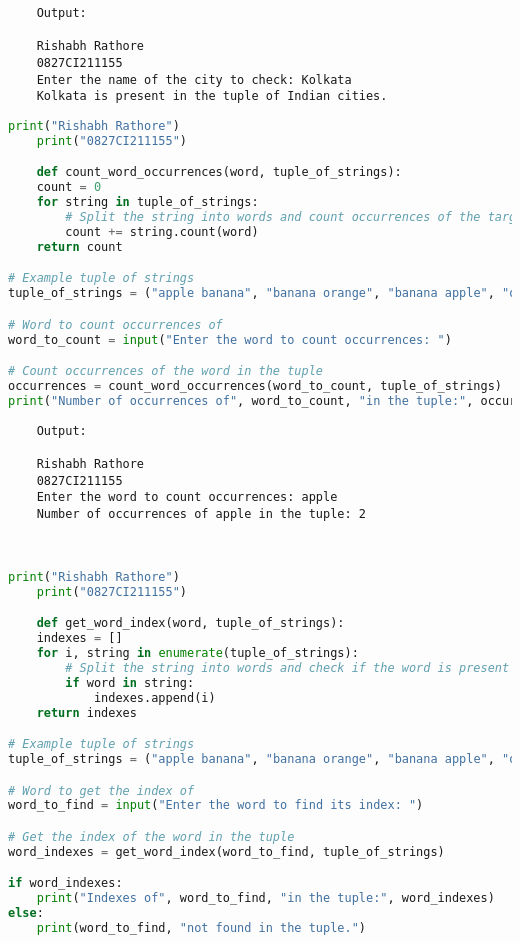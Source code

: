 \documentclass{report}
\begin{document}
\begin{verbatim}
	Output:

	Rishabh Rathore
	0827CI211155
	Enter the name of the city to check: Kolkata
	Kolkata is present in the tuple of Indian cities.

\end{verbatim}

\newpage


\sol 
\begin{lstlisting}[language=Python]
	print("Rishabh Rathore")
	print("0827CI211155")

	def count_word_occurrences(word, tuple_of_strings):
    count = 0
    for string in tuple_of_strings:
        # Split the string into words and count occurrences of the target word
        count += string.count(word)
    return count

# Example tuple of strings
tuple_of_strings = ("apple banana", "banana orange", "banana apple", "orange mango banana")

# Word to count occurrences of
word_to_count = input("Enter the word to count occurrences: ")

# Count occurrences of the word in the tuple
occurrences = count_word_occurrences(word_to_count, tuple_of_strings)
print("Number of occurrences of", word_to_count, "in the tuple:", occurrences)
\end{lstlisting}

\begin{verbatim}
	Output:

	Rishabh Rathore
	0827CI211155
	Enter the word to count occurrences: apple
	Number of occurrences of apple in the tuple: 2



\end{verbatim}

\newpage


\sol 
\begin{lstlisting}[language=Python]
	print("Rishabh Rathore")
	print("0827CI211155")

	def get_word_index(word, tuple_of_strings):
    indexes = []
    for i, string in enumerate(tuple_of_strings):
        # Split the string into words and check if the word is present
        if word in string:
            indexes.append(i)
    return indexes

# Example tuple of strings
tuple_of_strings = ("apple banana", "banana orange", "banana apple", "orange mango banana")

# Word to get the index of
word_to_find = input("Enter the word to find its index: ")

# Get the index of the word in the tuple
word_indexes = get_word_index(word_to_find, tuple_of_strings)

if word_indexes:
    print("Indexes of", word_to_find, "in the tuple:", word_indexes)
else:
    print(word_to_find, "not found in the tuple.")

\end{lstlisting}
\end{document}
